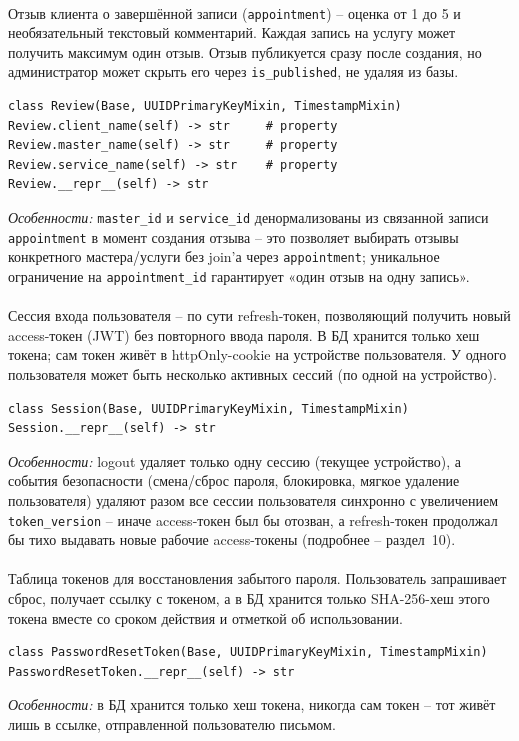 \paragraph{}
Отзыв клиента о завершённой записи (\texttt{appointment}) -- оценка от 1
до 5 и необязательный текстовый комментарий. Каждая запись на услугу
может получить максимум один отзыв. Отзыв публикуется сразу после
создания, но администратор может скрыть его через \texttt{is_published},
не удаляя из базы.
\begin{verbatim}
class Review(Base, UUIDPrimaryKeyMixin, TimestampMixin)
Review.client_name(self) -> str     # property
Review.master_name(self) -> str     # property
Review.service_name(self) -> str    # property
Review.__repr__(self) -> str
\end{verbatim}
\textit{Особенности:} \texttt{master_id} и \texttt{service_id}
денормализованы из связанной записи \texttt{appointment} в момент
создания отзыва -- это позволяет выбирать отзывы конкретного
мастера/услуги без join'а через \texttt{appointment}; уникальное
ограничение на \texttt{appointment_id} гарантирует «один отзыв на одну
запись».

\paragraph{}
Сессия входа пользователя -- по сути refresh-токен, позволяющий получить
новый access-токен (JWT) без повторного ввода пароля. В БД хранится
только хеш токена; сам токен живёт в httpOnly-cookie на устройстве
пользователя. У одного пользователя может быть несколько активных сессий
(по одной на устройство).
\begin{verbatim}
class Session(Base, UUIDPrimaryKeyMixin, TimestampMixin)
Session.__repr__(self) -> str
\end{verbatim}
\textit{Особенности:} logout удаляет только одну сессию (текущее
устройство), а события безопасности (смена/сброс пароля, блокировка,
мягкое удаление пользователя) удаляют разом все сессии пользователя
синхронно с увеличением \texttt{token_version} -- иначе access-токен
был бы отозван, а refresh-токен продолжал бы тихо выдавать новые рабочие
access-токены (подробнее -- раздел~10).

\paragraph{}
Таблица токенов для восстановления забытого пароля. Пользователь
запрашивает сброс, получает ссылку с токеном, а в БД хранится только
SHA-256-хеш этого токена вместе со сроком действия и отметкой об
использовании.
\begin{verbatim}
class PasswordResetToken(Base, UUIDPrimaryKeyMixin, TimestampMixin)
PasswordResetToken.__repr__(self) -> str
\end{verbatim}
\textit{Особенности:} в БД хранится только хеш токена, никогда сам
токен -- тот живёт лишь в ссылке, отправленной пользователю письмом.


